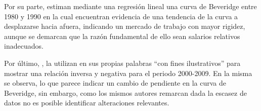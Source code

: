 Por su parte, \cite{DECON1993} estiman mediante una regresión lineal una curva de Beveridge entre 1980 y 1990 en la cual encuentran evidencia de una tendencia de la curva a desplazarse hacia afuera, indicando un mercado de trabajo con mayor rigidez, aunque se demarcan que la razón fundamental de ello sean salarios relativos inadecuados. 

Por último, \cite{Alma2011}, la utilizan en sus propias palabras ``con fines ilustrativos'' para mostrar una relación inversa y negativa para el periodo 2000-2009. En la misma se observa, lo que parece indicar un cambio de pendiente en la curva de Beveridge, sin embargo, como los mismos autores remarcan dada la escasez de datos no es posible identificar alteraciones relevantes.
